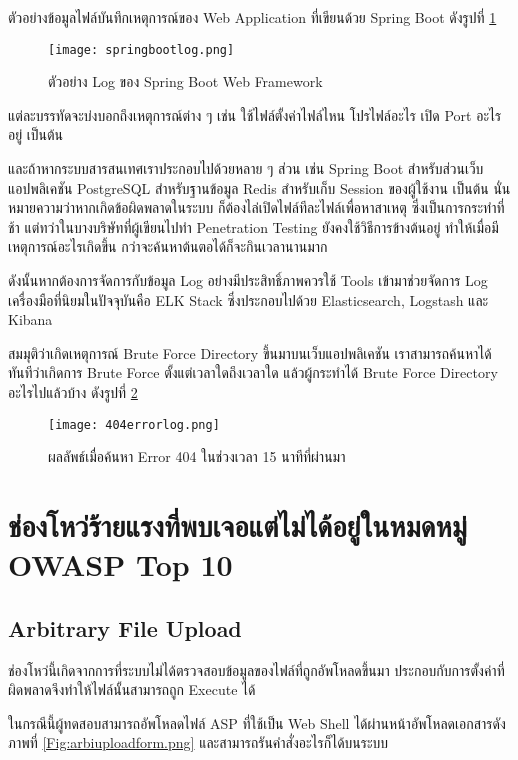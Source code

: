 ตัวอย่างข้อมูลไฟล์บันทึกเหตุการณ์ของ Web Application ที่เขียนด้วย Spring Boot ดังรูปที่ \ref{Fig:springbootlog.png}

\begin{figure}[h]
	\centering
	\texttt{[image: springbootlog.png]}
	\caption{ตัวอย่าง Log ของ Spring Boot Web Framework}
	\label{Fig:springbootlog.png}
\end{figure}

แต่ละบรรทัดจะบ่งบอกถึงเหตุการณ์ต่าง ๆ เช่น ใช้ไฟล์ตั้งค่าไฟล์ไหน โปรไฟล์อะไร เปิด Port อะไรอยู่ เป็นต้น

และถ้าหากระบบสารสนเทศเราประกอบไปด้วยหลาย ๆ ส่วน เช่น Spring Boot สำหรับส่วนเว็บแอปพลิเคชัน PostgreSQL สำหรับฐานข้อมูล Redis สำหรับเก็บ Session ของผู้ใช้งาน เป็นต้น นั่นหมายความว่าหากเกิดข้อผิดพลาดในระบบ ก็ต้องไล่เปิดไฟล์ทีละไฟล์เพื่อหาสาเหตุ ซึ่งเป็นการกระทำที่ช้า แต่ทว่าในบางบริษัทที่ผู้เขียนไปทำ Penetration Testing ยังคงใช้วิธีการข้างต้นอยู่ ทำให้เมื่อมีเหตุการณ์อะไรเกิดขึ้น กว่าจะค้นหาต้นตอได้ก็จะกินเวลานานมาก

ดังนั้นหากต้องการจัดการกับข้อมูล Log อย่างมีประสิทธิ์ภาพควรใช้ Tools เข้ามาช่วยจัดการ Log เครื่องมือที่นิยมในปัจจุบันคือ ELK Stack ซึ่งประกอบไปด้วย Elasticsearch, Logstash และ Kibana 

สมมุติว่าเกิดเหตุการณ์ Brute Force Directory ขึ้นมาบนเว็บแอปพลิเคชัน เราสามารถค้นหาได้ทันทีว่าเกิดการ Brute Force ตั้งแต่เวลาใดถึงเวลาใด แล้วผู้กระทำได้ Brute Force Directory อะไรไปแล้วบ้าง ดังรูปที่ \ref{Fig:404errorlog.png}

\begin{figure}[h!]
	\centering
	\texttt{[image: 404errorlog.png]}
	\caption{ผลลัพธ์เมื่อค้นหา Error 404 ในช่วงเวลา 15 นาทีที่ผ่านมา}
	\label{Fig:404errorlog.png}
\end{figure}

\section{ช่องโหว่ร้ายแรงที่พบเจอแต่ไม่ได้อยู่ในหมดหมู่ OWASP Top 10}

\subsection{Arbitrary File Upload}

ช่องโหว่นี้เกิดจากการที่ระบบไม่ได้ตรวจสอบข้อมูลของไฟล์ที่ถูกอัพโหลดขึ้นมา ประกอบกับการตั้งค่าที่ผิดพลาดจึงทำให้ไฟล์นั้นสามารถถูก Execute ได้

ในกรณีนี้ผู้ทดสอบสามารถอัพโหลดไฟล์ ASP ที่ใช้เป็น Web Shell ได้ผ่านหน้าอัพโหลดเอกสารดังภาพที่ \ref{Fig:arbiuploadform.png} และสามารถรันคำสั่งอะไรก็ได้บนระบบ

